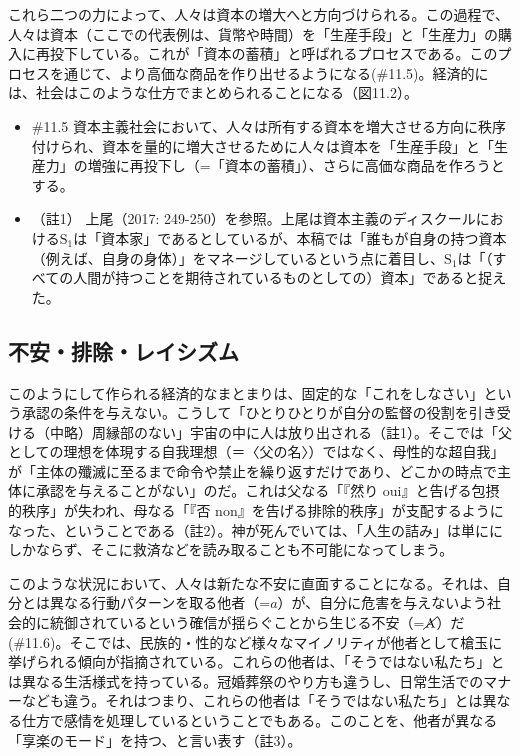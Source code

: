 これら二つの力によって、人々は資本の増大へと方向づけられる。この過程で、人々は資本（ここでの代表例は、貨幣や時間）を「生産手段」と「生産力」の購入に再投下している。これが「資本の蓄積」と呼ばれるプロセスである。このプロセスを通じて、より高価な商品を作り出せるようになる(\#11.5)。経済的には、社会はこのような仕方でまとめられることになる（図11.2）。

\begin{note}{}
  \begin{itemize}
    \tightlist
    \item{\#11.5}
      資本主義社会において、人々は所有する資本を増大させる方向に秩序付けられ、資本を量的に増大させるために人々は資本を「生産手段」と「生産力」の増強に再投下し（=「資本の蓄積」）、さらに高価な商品を作ろうとする。
  \end{itemize}
\end{note}

\begin{itemize}
\tightlist
\item
  （註1） 上尾（2017:
  249-250）\cite{Ueo}を参照。上尾は資本主義のディスクールにおける\(\textrm{S}_1\)は「資本家」であるとしているが、本稿では「誰もが自身の持つ資本（例えば、自身の身体）」をマネージしているという点に着目し、\(\textrm{S}_1\)は「（すべての人間が持つことを期待されているものとしての）資本」であると捉えた。
\end{itemize}

\subsection{不安・排除・レイシズム}\label{ux4e0dux5b89ux6392ux9664ux30ecux30a4ux30b7ux30baux30e0}

このようにして作られる経済的なまとまりは、固定的な「これをしなさい」という承認の条件を与えない。こうして「ひとりひとりが自分の監督の役割を引き受ける（中略）周縁部のない」宇宙の中に人は放り出される（註1）。そこでは「父としての理想を体現する自我理想（＝〈父の名〉）ではなく、母性的な超自我」が「主体の殲滅に至るまで命令や禁止を繰り返すだけであり、どこかの時点で主体に承認を与えることがない」のだ。これは父なる「『然り
oui』と告げる包摂的秩序」が失われ、母なる「『否
non』を告げる排除的秩序」が支配するようになった、ということである（註2）。神が死んでいては、「人生の詰み」は単ににしかならず、そこに救済などを読み取ることも不可能になってしまう。

このような状況において、人々は新たな不安に直面することになる。それは、自分とは異なる行動パターンを取る他者（=\(a\)）が、自分に危害を与えないよう社会的に統御されているという確信が揺らぐことから生じる不安（=\(\cancel{\textrm{A}}\)）だ(\#11.6)。そこでは、民族的・性的など様々なマイノリティが他者として槍玉に挙げられる傾向が指摘されている。これらの他者は、「そうではない私たち」とは異なる生活様式を持っている。冠婚葬祭のやり方も違うし、日常生活でのマナーなども違う。それはつまり、これらの他者は「そうではない私たち」とは異なる仕方で感情を処理しているということでもある。このことを、他者が異なる「享楽のモード」を持つ、と言い表す（註3）。


